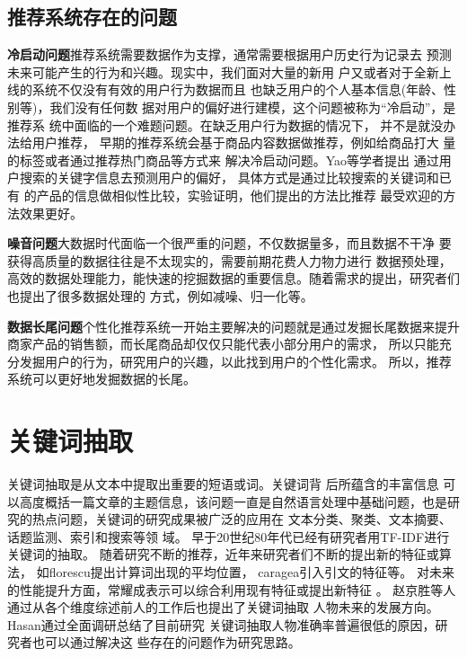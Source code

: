 \subsection{推荐系统存在的问题}

\textbf{冷启动问题}推荐系统需要数据作为支撑，通常需要根据用户历史行为记录去%
预测未来可能产生的行为和兴趣。现实中，我们面对大量的新用%
户又或者对于全新上线的系统不仅没有有效的用户行为数据而且%
也缺乏用户的个人基本信息(年龄、性别等)，我们没有任何数%
据对用户的偏好进行建模，这个问题被称为“冷启动”，是推荐系%
统中面临的一个难题问题。在缺乏用户行为数据的情况下，%
并不是就没办法给用户推荐，
早期的推荐系统会基于商品内容数据做推荐，例如给商品打大%
量的标签或者通过推荐热门商品等方式来%
解决冷启动问题。Yao等学者提出%
通过用户搜索的关键字信息去预测用户的偏好，%
具体方式是通过比较搜索的关键词和已有%
的产品的信息做相似性比较，实验证明，他们提出的方法比推荐%
最受欢迎的方法效果更好。

\textbf{噪音问题}大数据时代面临一个很严重的问题，不仅数据量多，而且数据不干净%
要获得高质量的数据往往是不太现实的，需要前期花费人力物力进行%
数据预处理，高效的数据处理能力，能快速的挖掘数据的重要信息。随着需求的提出，研究者们也提出了很多数据处理的%
方式，例如减噪、归一化等。

\textbf{数据长尾问题}个性化推荐系统一开始主要解决的问题就是通过发掘长尾数据来提升%
商家产品的销售额，而长尾商品却仅仅只能代表小部分用户的需求，%
所以只能充分发掘用户的行为，研究用户的兴趣，以此找到用户的个性化需求。%
所以，推荐系统可以更好地发掘数据的长尾。
\section{关键词抽取}
关键词抽取是从文本中提取出重要的短语或词。关键词背%
后所蕴含的丰富信息%
可以高度概括一篇文章的主题信息，该问题一直是自然语言处理中基础问题，也是研究的热点问题，关键词的研究成果被广泛的应用在%
文本分类、聚类、文本摘要、话题监测、索引和搜索等领%
域。%
早于20世纪80年代已经有研究者用TF-IDF进行关键词的抽取。%
随着研究不断的推荐，近年来研究者们不断的提出新的特征或算法，%
如florescu提出计算词出现的平均位置，%
caragea引入引文的特征等。%
对未来的性能提升方面，常耀成表示可以综合利用现有特征或提出新特征%
。%
赵京胜等人通过从各个维度综述前人的工作后也提出了关键词抽取%
人物未来的发展方向。%
Hasan通过全面调研总结了目前研究%
关键词抽取人物准确率普遍很低的原因，研究者也可以通过解决这%
些存在的问题作为研究思路。%


